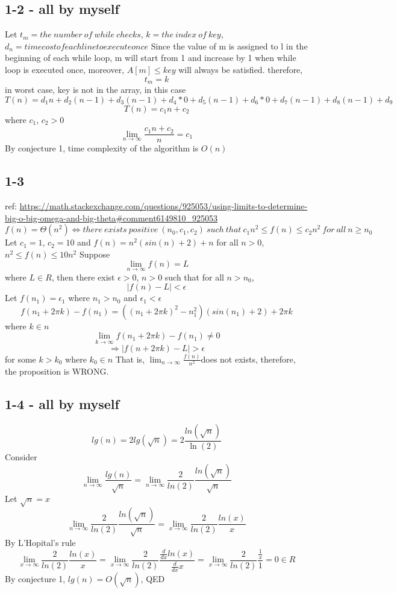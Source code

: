 \documentclass[12pt]{article}
\begin{document}
\subsection*{1-2 - all by myself}
Let $t_m = the\ number\ of\ while\ checks$, $k = the\ index\ of\ key$, $d_n = time cost of each line to execute once$\newline
Since the value of m is assigned to l in the beginning of each while loop, m will start from 1 and increase by 1 when while loop is executed once, moreover, $A[m] \leq key$ will always be satisfied.\newline
therefore,
\[t_m = k\]
in worst case, key is not in the array, in this case
\[T(n) = d_1n + d_2(n-1) + d_3(n-1) + d_4 * 0 + d_5(n-1) + d_6 * 0 + d_7(n-1) + d_8(n-1) + d_9\]
\[T(n) = c_1n + c_2\]
where $c_1$, $c_2 > 0$
\[\lim_{n \to \infty} {\frac{c_1n + c_2}{n}} = c_1\]
By conjecture 1, time complexity of the algorithm is $O(n)$

\subsection*{1-3}
ref: \url{https://math.stackexchange.com/questions/925053/using-limits-to-determine-big-o-big-omega-and-big-theta#comment6149810_925053}\newline
\[f(n)=\Theta(n^2)\Longleftrightarrow there\ exists\ positive\ (n_0, c_1, c_2)\ such\ that\ c_1n^2\leq f(n)\leq c_2n^2\ for\ all\ n\geq n_0\]
Let \(c_1 = 1\), \(c_2 = 10\) and \(f(n) = n^2(sin(n) + 2) + n\)\newline
for all \(n > 0\), \(n^2  \leq f(n) \leq 10n^2\)\newline
Suppose
\[\lim_{n \to \infty} {f(n)} = L\]
where $L \in R$, then there exist $\epsilon > 0$, $n > 0$ such that for all $n > n_0$,
\[|f(n)-L|<\epsilon\]
Let $f(n_1) = \epsilon_1$ where $n_1 > n_0$ and $\epsilon_1 < \epsilon$
\[f(n_1 + 2\pi k) - f(n_1) = ((n_1+2\pi k)^2-n_1^2)(sin(n_1) + 2) + 2\pi k\]
where $k \in n$
\[\lim_{k \to \infty}{f(n_1 + 2\pi k) - f(n_1)} \neq 0\]
\[\Rightarrow |f(n+2\pi k) - L| > \epsilon\]
for some $k > k_0$  where $k_0 \in n$\newline
That is, $\lim_{n \to \infty} {\frac{f(n)}{n^2}} $does not exists, therefore, the proposition is WRONG.

\subsection*{1-4 - all by myself}
\[lg(n) = 2lg(\sqrt{n}) = 2\frac{ln(\sqrt{n})}{\ln(2)}\]
Consider
\[\lim_{n \to \infty}{\frac{lg(n)}{\sqrt{n}}} = \lim_{n \to \infty}{\frac{2}{ln(2)}\frac{ln(\sqrt{n})}{\sqrt{n}}}\]
Let \(\sqrt{n} = x\)
\[\lim_{n \to \infty}{\frac{2}{ln(2)}\frac{ln(\sqrt{n})}{\sqrt{n}}} = \lim_{x \to \infty}{\frac{2}{ln(2)}\frac{ln(x)}{x}}\]
By L'Hopital's rule
\[\lim_{x \to \infty}{\frac{2}{ln(2)}\frac{ln(x)}{x}} = \lim_{x \to \infty}{\frac{2}{ln(2)}\frac{\frac{d}{dx}ln(x)}{\frac{d}{dx}x}} = \lim_{x \to \infty}{\frac{2}{ln(2)}\frac{\frac{1}{x}}{1}}=0 \in R\]
By conjecture 1, $lg(n) = O(\sqrt{n})$, QED
\end{document}

